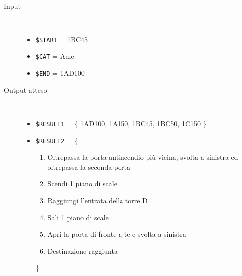 \documentclass[../../SperimentazioniPratiche.tex]{subfiles}
\begin{document}
			\paragraph*{}
			\label{2Prova1D.1}
			\begin{tcolorbox}[fonttitle=\bfseries, 
								adjusted title={\Large Prova 1D.1}, 
								breakable, 
								sharp corners=south,
								colback=white, 
								colframe=white!60!black]
								
				\begin{description}%
				
					\item[Input] \ \par 
        				\begin{itemize}
							\item \verb|$START| = 1BC45
        					\item \verb|$CAT| = Aule
							\item \verb|$END| = 1AD100
        				\end{itemize}
        				
        			\tcbline 
        				
        			\item[Output atteso] \ \par
        				\begin{itemize}
        				
        					\item \verb|$RESULT1| = \{
        						1AD100, 1A150, 1BC45, 1BC50, 1C150
        					\}
        				
        					\item \verb|$RESULT2| = \{
        					\begin{enumerate}
        						\item Oltrepassa la porta antincendio più vicina, svolta a sinistra ed oltrepassa la seconda porta
        						\item Scendi 1 piano di scale
        						\item Raggiungi l'entrata della torre D
        						\item Sali 1 piano di scale
        						\item Apri la porta di fronte a te e svolta a sinistra 
        						\item Destinazione raggiunta
        					\end{enumerate}
        					\}
        					
        				\end{itemize}


\end{description}
\end{tcolorbox}
\end{document}
